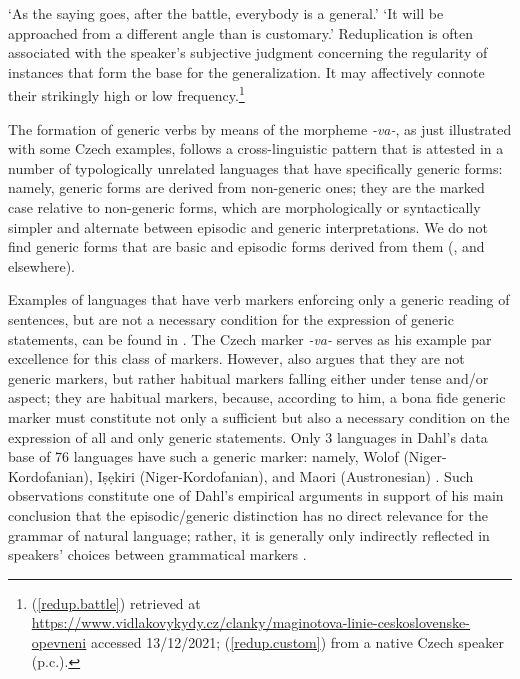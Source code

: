 \documentclass[output=paper,colorlinks,citecolor=brown]{langscibook}
\begin{document}
\ea
{}
\glt `As the saying goes, after the battle, everybody is a general.' 
\glt `It will be approached from a different angle than is customary.'
\z
\z
\noindent
Reduplication is often associated with the speaker's subjective judgment concerning the regularity of instances that form the base for the generalization.
It may affectively connote their strikingly high or low frequency.\footnote{(\ref{redup.battle}) retrieved at \url{https://www.vidlakovykydy.cz/clanky/maginotova-linie-ceskoslovenske-opevneni} accessed 13/12/2021; 
(\ref{redup.custom}) from a native Czech speaker (p.c.).}

The formation of generic verbs by means of the morpheme
\textit{-va-}, as just illustrated with some Czech examples,
follows a cross-linguistic pattern that is attested
in a number of typologically unrelated languages that have specifically 
generic forms: namely, generic forms are derived from non-generic ones; they are the marked case relative to non-generic forms, which are morphologically or syntactically simpler and alternate between episodic and generic interpretations. We do not find generic forms that are basic and episodic forms derived from them (\citealt{carlson1995truth,carlson2005}, and elsewhere). 

Examples of languages that have verb markers 
enforcing only a generic reading of sentences, but
are not a necessary condition for the expression of generic statements, can be found in 
\citet{Dahl1985, dahl1995}. The Czech marker \textit{-va-} serves as his example par excellence for this class of markers.
However, \citet{dahl1995} also argues that 
they are not generic markers, but rather habitual markers falling either under
tense and/or aspect; they are habitual markers, because,  
according to him, a bona fide
generic marker must constitute not only a sufficient but also a necessary condition on the expression of all and only generic statements.
Only 3 languages in Dahl's data base of 76 languages have 
such a generic marker: namely, Wolof (Niger-Kordofanian), Iṣẹkiri (Niger-Kordofanian), and Maori (Austronesian) \citep[420,~424]{dahl1995}. Such observations constitute 
one of Dahl's empirical arguments 
in support of his main  conclusion that the episodic/generic distinction has no direct relevance for the grammar of natural language; rather, it is generally only indirectly reflected in speakers' choices between grammatical markers \citep[425]{dahl1995}.
\end{document}

